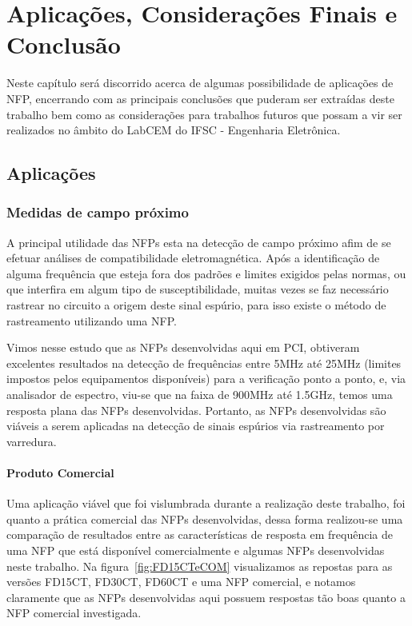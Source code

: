 \chapter{Aplicações, Considerações Finais e Conclusão}
Neste capítulo será discorrido acerca de algumas possibilidade de aplicações de NFP, encerrando com as principais conclusões que puderam ser extraídas deste trabalho bem como as considerações para trabalhos futuros que possam a vir ser realizados no âmbito do LabCEM do IFSC - Engenharia Eletrônica.

\section{Aplicações}
\subsection{Medidas de campo próximo}
A principal utilidade das NFPs esta na detecção de campo próximo afim de se efetuar análises de compatibilidade eletromagnética. Após a identificação de alguma frequência que esteja fora dos padrões e limites exigidos pelas normas, ou que interfira em algum tipo de susceptibilidade, muitas vezes se faz necessário rastrear no circuito a origem deste sinal espúrio, para isso existe o método de rastreamento utilizando uma NFP. 

Vimos nesse estudo que as NFPs desenvolvidas aqui em PCI, obtiveram excelentes resultados na detecção de frequências entre 5MHz até 25MHz (limites impostos pelos equipamentos disponíveis) para a verificação ponto a ponto, e, via analisador de espectro, viu-se que na faixa de 900MHz até 1.5GHz, temos uma resposta plana das NFPs desenvolvidas. Portanto, as NFPs desenvolvidas são viáveis a serem aplicadas na detecção de sinais espúrios via rastreamento por varredura.

\subsubsection{Produto Comercial}
Uma aplicação viável que foi vislumbrada durante a realização deste trabalho, foi quanto a prática comercial das NFPs desenvolvidas, dessa forma realizou-se uma comparação de resultados entre as características de resposta em frequência de uma NFP que está disponível comercialmente e algumas NFPs desenvolvidas neste trabalho. Na figura~\ref{fig:FD15CTeCOM} visualizamos as repostas para as versões FD15CT, FD30CT, FD60CT e uma NFP comercial, e notamos claramente que as NFPs desenvolvidas aqui possuem respostas tão boas quanto a NFP comercial investigada.

